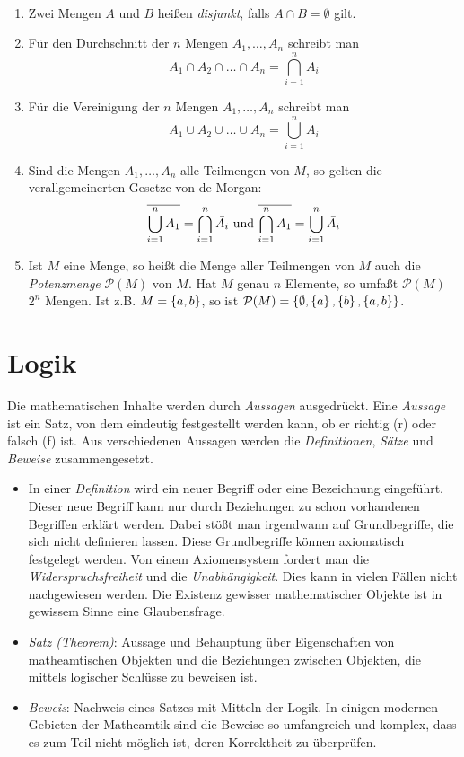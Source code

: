 \begin{bemerkung}~
\begin{enumerate}
\item Zwei Mengen $A$ und $B$ heißen \emph{disjunkt}, falls $A \cap B = \emptyset$ gilt.
\item Für den Durchschnitt der $n$ Mengen $A_1, \dots, A_n$ schreibt man \[A_1 \cap A_2 \cap \dots \cap A_n = \bigcap_{i = 1}^{n} A_i\]
\item Für die Vereinigung der $n$ Mengen $A_1, \dots, A_n$ schreibt man \[A_1 \cup A_2 \cup \dots \cup A_n = \bigcup_{i = 1}^{n} A_i\]
\item Sind die Mengen $A_1, \dots, A_n$ alle Teilmengen von $M$, so gelten die verallgemeinerten Gesetze von de Morgan:
	\[\overline{\bigcup_{i = 1}^{n} A_1} = \bigcap_{i = 1}^{n} \bar{A_i}
	\text{ und }
	\overline{\bigcap_{i = 1}^{n} A_1} = \bigcup_{i = 1}^{n} \bar{A_i}\]

\item Ist $M$ eine Menge, so heißt die Menge aller Teilmengen von $M$ auch die \emph{Potenzmenge} $\mathcal{P}(M)$ von $M$. Hat $M$ genau $n$ Elemente, so umfaßt $\mathcal{P}(M)$ $2^n$ Mengen. Ist \ac{z.B.} $M = \left\{a, b\right\}$, so ist $\mathcal{P}(M) = \left\{\emptyset, \left\{a\right\}, \left\{b\right\}, \left\{a, b\right\}\right\}$.
\end{enumerate}
\end{bemerkung}

\chapter{Logik}
Die mathematischen Inhalte werden durch \emph{Aussagen} ausgedrückt. Eine \emph{Aussage} ist ein Satz, von dem eindeutig festgestellt werden kann, ob er richtig (r) oder falsch (f) ist. Aus verschiedenen Aussagen werden die \emph{Definitionen}, \emph{Sätze} und \emph{Beweise} zusammengesetzt.
\begin{itemize}
\item In einer \emph{Definition} wird ein neuer Begriff oder eine Bezeichnung eingeführt. Dieser neue Begriff kann nur durch Beziehungen zu schon vorhandenen Begriffen erklärt werden. Dabei stößt man irgendwann auf Grundbegriffe, die sich nicht definieren lassen. Diese Grundbegriffe können axiomatisch festgelegt werden. Von einem Axiomensystem fordert man die \emph{Widerspruchsfreiheit} und die \emph{Unabhängigkeit}. Dies kann in vielen Fällen nicht nachgewiesen werden. Die Existenz gewisser mathematischer Objekte ist in gewissem Sinne eine Glaubensfrage.
\item \emph{Satz (Theorem)}: Aussage und Behauptung über Eigenschaften von matheamtischen Objekten und die Beziehungen zwischen Objekten, die mittels logischer Schlüsse zu beweisen ist.
\item \emph{Beweis}: Nachweis eines Satzes mit Mitteln der Logik. In einigen modernen Gebieten der Matheamtik sind die Beweise so umfangreich und komplex, dass es zum Teil nicht möglich ist, deren Korrektheit zu überprüfen.
\end{itemize}

